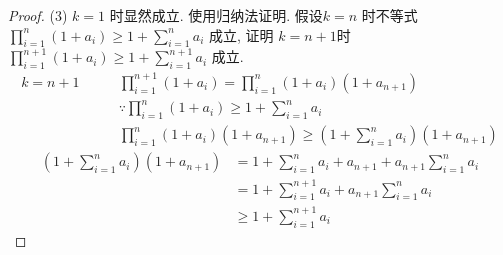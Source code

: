 \begin{example}
\begin{proof}
		(3)
		$ k = 1 $ 时显然成立. 使用归纳法证明. 假设$ k = n $ 时不等式
		$ \prod_{i=1}^{n}(1+a_i) \ge 1 + \sum_{i=1}^n a_i  $
		成立, 证明 $ k = n+1 $时 
		$  \prod_{i=1}^{n+1}(1+a_i) \ge 1 + \sum_{i=1}^{n+1} a_i  $
		成立.		
		\begin{align*}
			k = n+1 \qquad  
			& \prod_{i=1}^{n+1}(1+a_i) = \prod_{i=1}^{n}(1+a_i)  (1+a_{n+1})\\
			& \because \prod_{i=1}^{n}(1+a_i) \ge 1 + \sum_{i=1}^n a_i  \\
			& \prod_{i=1}^{n}(1+a_i)  (1+a_{n+1}) \ge (1 + \sum_{i=1}^n a_i)(1+a_{n+1})
		\end{align*}
		\begin{align*}
			(1 + \sum_{i=1}^n a_i)(1+a_{n+1}) & = 1 + \sum_{i=1}^n a_i + a_{n+1} + a_{n+1} \sum_{i=1}^n a_i\\
			& = 1 + \sum_{i=1}^{n+1} a_i + a_{n+1} \sum_{i=1}^n a_i\\
			& \ge 1 + \sum_{i=1}^{n+1} a_i
		\end{align*}
	\end{proof}
\end{example}

